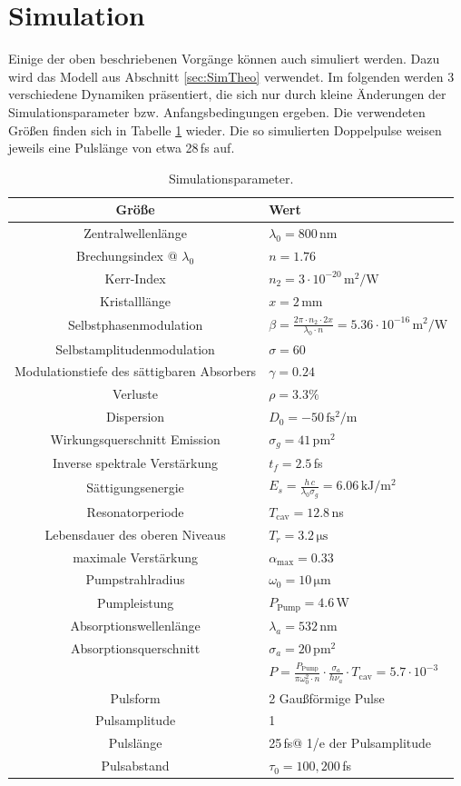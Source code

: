 \documentclass[bachelor,       %
               twoside,        %
               BCOR10mm,       %
               liststotoc,nomtotoc,bibtotoc, %
               english,ngerman, %
               final,          %
               ]{GAUBM}
\begin{document}
\section{Simulation}
Einige der oben beschriebenen Vorgänge können auch simuliert werden.
Dazu wird das Modell aus Abschnitt \ref{sec:SimTheo} verwendet.
Im folgenden werden 3 verschiedene Dynamiken präsentiert, die sich nur durch kleine Änderungen der Simulationsparameter bzw. Anfangsbedingungen ergeben.
Die verwendeten Größen finden sich in Tabelle \ref{tab:SimParam} wieder.
Die so simulierten Doppelpulse weisen jeweils eine Pulslänge von etwa 28\,fs auf.
\begin{table}[!htb]
	\centering
	\begin{tabular}{|c|l|}
		\hline
		Größe & Wert\\
		\hline
		Zentralwellenlänge & $\lambda_0=800\,$nm\\	
		Brechungsindex @ $\lambda_0$ & $n=1.76$\\
		Kerr-Index & $n_2=3\cdot 10^{-20}\,\si{\meter^2\per\watt}$\\
		Kristalllänge & $x=2\,$mm\\
		Selbstphasenmodulation & $\beta=\frac{2\pi\cdot n_2\cdot 2x}{\lambda_0\cdot n}=5.36\cdot 10^{-16}\,\si{\meter^2\per\watt}$\\
		Selbstamplitudenmodulation & $\sigma=60$\\
		Modulationstiefe des sättigbaren Absorbers & $\gamma=0.24$\\
		Verluste & $\rho=3.3\%$\\
		Dispersion & $D_0=-50\,\si{\femto\second^2\per\meter}$\\
		Wirkungsquerschnitt Emission & $\sigma_g=41\,\si{\pico\meter^2}$\\
		Inverse spektrale Verstärkung & $t_f=2.5\,$fs\\	
		Sättigungsenergie & $E_s=\frac{h\,c}{\lambda_0\sigma_g}= 6.06\,\si{\kilo\joule\per\meter^2}$\\
		Resonatorperiode & $T_\text{cav}=12.8\,$ns\\
		Lebensdauer des oberen Niveaus & $T_r=3.2\,\si{\micro\second}$\\
		maximale Verstärkung & $\alpha_\text{max}=0.33$\\
		Pumpstrahlradius & $\omega_0=10\,\si{\micro\meter}$\\
		Pumpleistung & $P_\text{Pump}=4.6\,$W\\
		Absorptionswellenlänge & $\lambda_a=532\,$nm\\
		Absorptionsquerschnitt & $\sigma_a=20\,\si{\pico\meter^2}$\\
		& $P=\frac{P_\text{Pump}}{\pi\omega_0^2\cdot n}\cdot\frac{\sigma_a}{h\nu_a}\cdot T_\text{cav}=5.7\cdot 10^{-3}$\\
		\hline		
		Pulsform & 2 Gaußförmige Pulse\\
		Pulsamplitude & 1\\
		Pulslänge & 25\,fs\quad @ 1/e der Pulsamplitude\\
		Pulsabstand & $\tau_0=100,200\,$fs\\
		\hline
	\end{tabular}
	\caption{Simulationsparameter.}
	\label{tab:SimParam}
\end{table}
\end{document}
